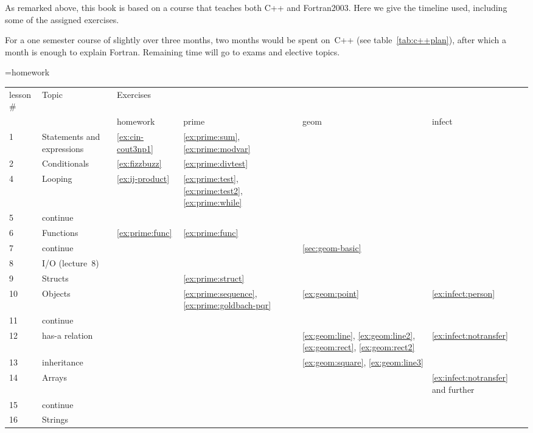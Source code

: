 As remarked above, this book is based on a course that teaches both
C++ and Fortran2003. Here we give the timeline used, including some of
the assigned exercises.

For a one semester course of slightly over three months, two months
would be spent on~C++ (see table~\ref{tab:c++plan}), after which a
month is enough to explain Fortran. Remaining time will go to exams
and elective topics.

\begin{table}[ht]
  =\hbox{homework }\edef\colwidth{\the\wd0}
  \begin{tabular}{|l|p{\colwidth}|p{\colwidth}p{\colwidth}p{\colwidth}p{\colwidth}|}
    \hline
    lesson$\#$&Topic&Exercises&&&\\
    &&homework&prime&geom&infect\\
    \hline
    1 & Statements and expressions
        &\ref{ex:cin-cout3np1}
        &\ref{ex:prime:sum}, \ref{ex:prime:modvar}&&\\
    2 & Conditionals
        &\ref{ex:fizzbuzz}&\ref{ex:prime:divtest}&&\\
    4 & Looping
        &\ref{ex:ij-product}
        &\ref{ex:prime:test}, \ref{ex:prime:test2}, \ref{ex:prime:while}&&\\
    5 & continue
        &&&&\\
    6 & Functions
        &\ref{ex:prime:func}&\ref{ex:prime:func}&&\\
    7 & continue
        &&&\ref{sec:geom-basic}&\\
    8 & I/O (lecture~8)
        &&&&\\
    9 & Structs
        &&\ref{ex:prime:struct}&&\\
    10 & Objects
        &&\ref{ex:prime:sequence}, \ref{ex:prime:goldbach-pqr}&
        \ref{ex:geom:point}&\ref{ex:infect:person}\\
    11 & continue
        &&&&\\
    12 & has-a relation
        &&&\ref{ex:geom:line}, \ref{ex:geom:line2},
        \ref{ex:geom:rect}, \ref{ex:geom:rect2}&\ref{ex:infect:notransfer}\\
    13 & inheritance
        &&&\ref{ex:geom:square}, \ref{ex:geom:line3}&\\
    14 & Arrays
        &&&&\ref{ex:infect:notransfer} and further\\
    15 & continue
        &&&&\\
    16 & Strings

\end{tabular}
\end{table}
